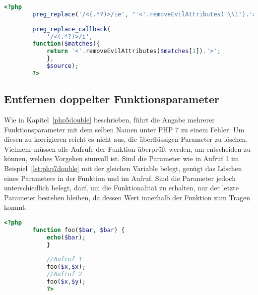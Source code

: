     \begin{lstlisting}[language=php, caption={Beispiel der Nutzung von preg\_replace\_callback}, label={lst:php7preg_rep}]
        <?php
        preg_replace('/<(.*?)>/ie', "'<'.removeEvilAttributes('\\1').'>'", $source);
        
        preg_replace_callback(
            '/<(.*?)>/i', 
        function($matches){
            return '<'.removeEvilAttributes($matches[1]).'>';
            },
            $source);
        ?>
    \end{lstlisting}
            
    \subsection{Entfernen doppelter Funktionsparameter}
    Wie in Kapitel~\ref{php5double} beschrieben, führt die Angabe mehrerer Funktionsparameter mit dem selben Namen unter \ac{PHP} 7 zu einem Fehler.
    Um diesen zu korrigieren reicht es nicht aus, die überflüssigen Parameter zu löschen. Vielmehr müssen alle Aufrufe der Funktion überprüft werden, 
    um entscheiden zu können, welches Vorgehen sinnvoll ist. Sind die Parameter wie in Aufruf 1 im Beispiel~\ref{lst:php7double} mit der gleichen Variable 
    belegt, genügt das Löschen eines Parameters in der Funktion und im Aufruf. Sind die Parameter jedoch unterschiedlich belegt, darf, um die Funktionalität 
    zu erhalten, nur der letzte Parameter bestehen bleiben, da dessen Wert innerhalb der Funktion zum Tragen kommt.
    
    \begin{lstlisting}[language=php, caption={Beispiel der Nutzung von preg\_replace\_callback}, label={lst:php7double}]
        <?php
        function foo($bar, $bar) {
            echo($bar);
            }
            
            //Aufruf 1
            foo($x,$x);
            //Aufruf 2
            foo($x,$y);
            ?>
        \end{lstlisting}
                
